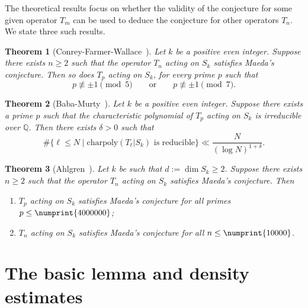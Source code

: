 \documentclass[11pt]{article}
\theoremstyle{plain}
\newtheorem{theorem}{Theorem}[section]
\theoremstyle{definition}
\theoremstyle{remark}
\numberwithin{equation}{section}
\numberwithin{table}{section}
\newcommand{\QQ}{\mathbb{Q}}
\begin{document}
The theoretical results focus on whether the validity of the conjecture for
some given operator $T_m$ can be used to deduce the conjecture for other
operators $T_n$.  We state three such results.

\begin{theorem}[Conrey-Farmer-Wallace~\cite{ConreyFarmerWallace}]
  \label{thm:CFW}
  Let $k$ be a positive even integer.  Suppose there exists $n\geq 2$ such
  that the operator $T_n$ acting on $S_k$ satisfies Maeda's conjecture.  Then
  so does $T_p$ acting on $S_k$, for every prime $p$ such that
  \begin{equation*}
    p\not\equiv \pm 1\pmod{5}\qquad\text{or}\qquad
    p\not\equiv \pm 1\pmod{7}.
  \end{equation*}
\end{theorem}

\begin{theorem}[Baba-Murty~\cite{BabaMurty}]
  Let $k$ be a positive even integer.  Suppose there exists a prime $p$ such
  that the characteristic polynomial of $T_p$ acting on $S_k$ is irreducible
  over $\QQ$.  Then there exists $\delta>0$ such that
  \begin{equation*}
    \#\{\ell\leq N\mid \text{charpoly}(T_\ell|S_k)\text{ is reducible}\}
    \ll \frac{N}{(\log N)^{1+\delta}}.
  \end{equation*}
\end{theorem}

\begin{theorem}[Ahlgren~\cite{Ahlgren}]\label{thm:Ahl}
  Let $k$ be such that $d:=\dim S_k\geq 2$.  Suppose there exists $n\geq 2$
  such that the operator $T_n$ acting on $S_k$ satisfies Maeda's conjecture.
  Then
  \begin{enumerate}
    \item $T_p$ acting on $S_k$ satisfies Maeda's conjecture for all primes
      $p\leq\numprint{4000000}$;
    \item $T_n$ acting on $S_k$ satisfies Maeda's conjecture for all
      $n\leq\numprint{10000}$.
  \end{enumerate}
\end{theorem}




\section{The basic lemma and density estimates}
\end{document}

